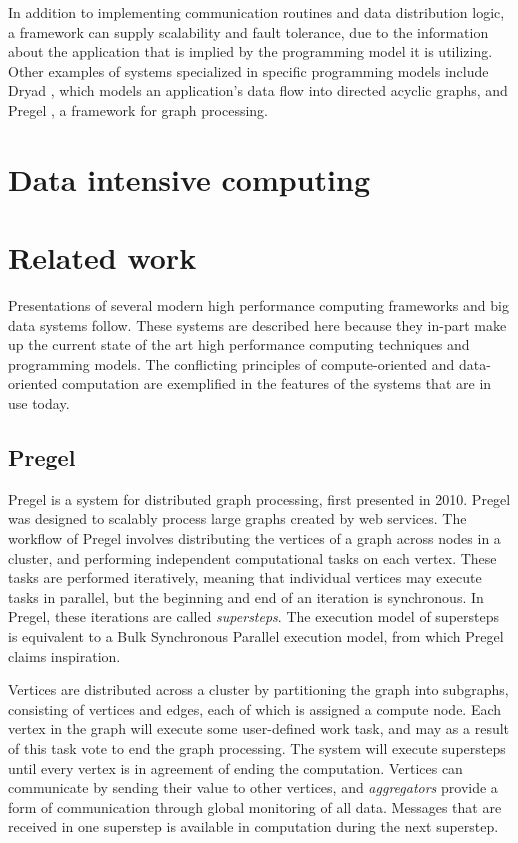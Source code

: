 \documentclass{uit-report}
\begin{document}
In addition to implementing communication routines and data distribution logic, a framework can supply scalability and fault tolerance, due to the information about the application that is implied by the programming model it is utilizing. Other examples of systems specialized in specific programming models include Dryad \cite{dryad}, which models an application's data flow into directed acyclic graphs, and Pregel \cite{pregel}, a framework for graph processing.

\section{Data intensive computing}

\section{Related work}
Presentations of several modern high performance computing frameworks and big data systems follow. These systems are described here because they in-part make up the current state of the art high performance computing techniques and programming models. The conflicting principles of compute-oriented and data-oriented computation are exemplified in the features of the systems that are in use today.

\subsection{Pregel}
Pregel \cite{pregel} is a system for distributed graph processing, first presented in 2010. Pregel was designed to scalably process large graphs created by web services. The workflow of Pregel involves distributing the vertices of a graph across nodes in a cluster, and performing independent computational tasks on each vertex. These tasks are performed iteratively, meaning that individual vertices may execute tasks in parallel, but the beginning and end of an iteration is synchronous. In Pregel, these iterations are called \emph{supersteps}. The execution model of supersteps is equivalent to a Bulk Synchronous Parallel execution model, from which Pregel claims inspiration. 

Vertices are distributed across a cluster by partitioning the graph into subgraphs, consisting of vertices and edges, each of which is assigned a compute node. Each vertex in the graph will execute some user-defined work task, and may as a result of this task vote to end the graph processing. The system will execute supersteps until every vertex is in agreement of ending the computation. Vertices can communicate by sending their value to other vertices, and \emph{aggregators} provide a form of communication through global monitoring of all data. Messages that are received in one superstep is available in computation during the next superstep.
\end{document}

